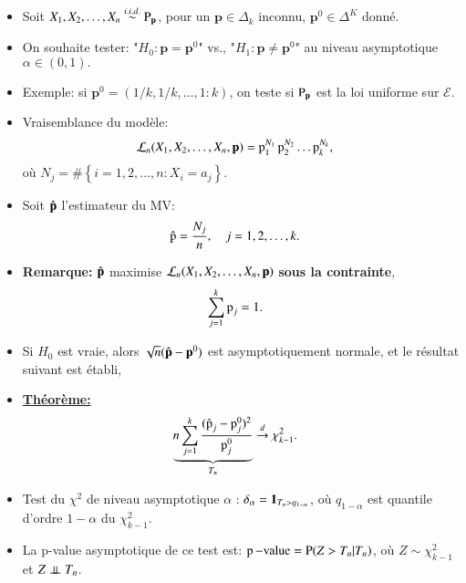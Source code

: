 \begin{frame}
\begin{itemize}
        \item Soit $X_1, X_2, \ldots, X_n\overset{i.i.d.}{\sim} \operatorname{P}_{\mathbf{p}}$, pour un $\mathbf{p}\in\Delta_k$ inconnu, 
        $\mathbf{p}^{0}\in\Delta^K$ donné.
        \item On souhaite tester: "$H_0: \mathbf{p} = \mathbf{p}^0$" vs., "$H_1: \mathbf{p} \neq \mathbf{p}^0$" 
        au niveau asymptotique $\alpha\in(0,1).$
        \item Exemple: si $\mathbf{p}^0 = (1/k, 1/k, \ldots, 1:k)$, on teste si $\operatorname{P}_{\mathbf{p}}$ est la loi uniforme sur $\mathcal{E}$.
         \framebreak
         \item Vraisemblance du modèle:
         \begin{align*}
             \mathcal{L}_n(X_1, X_2, \ldots, X_n, {\mathbf p}) &= \operatorname{p}_1^{N_1}\operatorname{p}_{2}^{N_2}\ldots\operatorname{p}_k^{N_k},
         \end{align*}
         où $N_j = \#\left\{i = 1, 2, \ldots, n: X_i=a_j\right\}$.
         \item Soit $\hat{{\mathbf p}}$ l'estimateur du MV: \begin{align*}
            \hat{\operatorname{p}} &= \frac{N_j}{n}, \quad j = 1, 2, \ldots, k.
         \end{align*}
         \item \textbf{Remarque:} $\hat{{\mathbf p}}$ maximise $\mathcal{L}_n(X_1, X_2, \ldots, X_n, {\mathbf p})$ 
         \textbf{sous la contrainte}, \begin{align*}
             \sum_{j=1}^k\operatorname{p}_j &=1.
         \end{align*}
         \framebreak 
         \item Si $H_0$ est vraie, alors $\sqrt{n}(\hat{{\mathbf p}} - {\mathbf p}^0)$ est asymptotiquement normale, 
          et le résultat suivant est établi,
          \item \textbf{\underline{Théorème:}} \begin{align*}
              \underbrace{n\sum_{j=1}^k\frac{(\hat{\operatorname{p}}_j - \operatorname{p}_j^0)^2}{\operatorname{p}_j^0}}_{T_n}&\overset{d}{\rightarrow} \chi^2_{k-1}.
          \end{align*}
          \item Test du $\chi^2$ de niveau asymptotique $\alpha$ : $\delta_\alpha = \mathbf{1}_{T_n>q_{1-\alpha}}$, où $q_{1-\alpha}$ est 
          quantile d'ordre $1-\alpha$ du $\chi^2_{k-1}$.
          \item La p-value asymptotique de ce test est: $\operatorname{p}-\text{value} = \operatorname{P}(Z> T_n| T_n)$, où $Z\sim\chi^2_{k-1}$ 
          et $Z\perp\!\!\!\perp T_n$.
    \end{itemize}
\end{frame}

